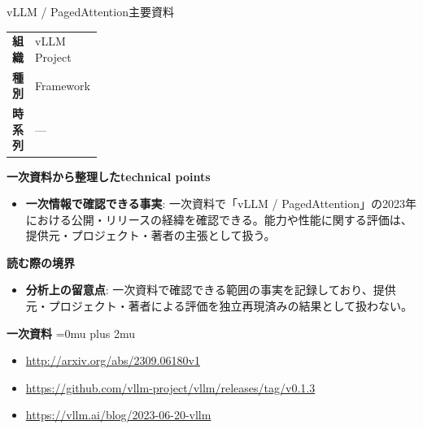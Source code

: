 \begin{technicalnote}{vLLM / PagedAttention}{主要資料}
\begingroup
\begin{tabularx}{\linewidth}{@{}>{\bfseries}p{0.22\linewidth}X@{}}
組織 & vLLM Project \\
種別 & Framework \\
時系列 & — \\
\end{tabularx}
\smallskip
{\bfseries 一次資料から整理したtechnical points}
\begin{itemize}[leftmargin=1.5em,itemsep=0.35em]
\item \textbf{一次情報で確認できる事実}: 一次資料で「vLLM / PagedAttention」の2023年における公開・リリースの経緯を確認できる。能力や性能に関する評価は、提供元・プロジェクト・著者の主張として扱う。
\end{itemize}
\begin{minipage}{\linewidth}
{\bfseries 読む際の境界}
\begin{itemize}[leftmargin=1.5em,itemsep=0.35em]
\item \textbf{分析上の留意点}: 一次資料で確認できる範囲の事実を記録しており、提供元・プロジェクト・著者による評価を独立再現済みの結果として扱わない。
\end{itemize}
\begin{samepage}
{\bfseries 一次資料}
\begingroup\sloppy
\Urlmuskip=0mu plus 2mu\relax
\begin{itemize}[leftmargin=1.5em,itemsep=0.25em]
\item {\scriptsize\url{http://arxiv.org/abs/2309.06180v1}}
\item {\scriptsize\url{https://github.com/vllm-project/vllm/releases/tag/v0.1.3}}
\item {\scriptsize\url{https://vllm.ai/blog/2023-06-20-vllm}}
\end{itemize}
\endgroup
\end{samepage}
\end{minipage}
\endgroup
\end{technicalnote}
\medskip


